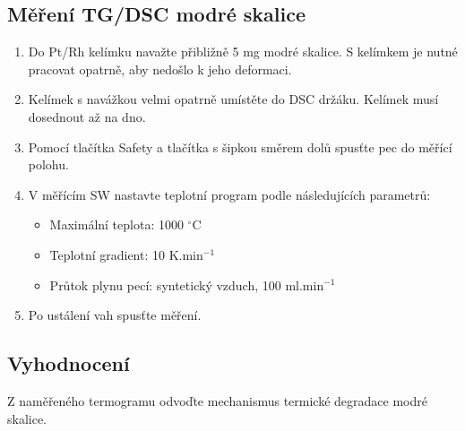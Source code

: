 \documentclass[12pt]{article}
\begin{document}
\subsection{Měření TG/DSC modré skalice}

\begin{enumerate}
	\item Do Pt/Rh kelímku navažte přibližně 5 mg modré skalice. S kelímkem je nutné pracovat opatrně, aby nedošlo k jeho deformaci.
	\item Kelímek s navážkou velmi opatrně umístěte do DSC držáku. Kelímek musí dosednout až na dno.
	\item Pomocí tlačítka Safety a tlačítka s šipkou směrem dolů spusťte pec do měřící polohu.
	\item V měřícím SW nastavte teplotní program podle následujících parametrů:
	\begin{itemize}
		\item Maximální teplota: 1000 $^\circ$C
		\item Teplotní gradient: 10 K.min$^{-1}$
		\item Průtok plynu pecí: syntetický vzduch, 100 ml.min$^{-1}$
	\end{itemize}
	\item Po ustálení vah spusťte měření.
\end{enumerate}

\subsection{Vyhodnocení}
Z naměřeného termogramu odvoďte mechanismus termické degradace modré skalice.
\end{document}
